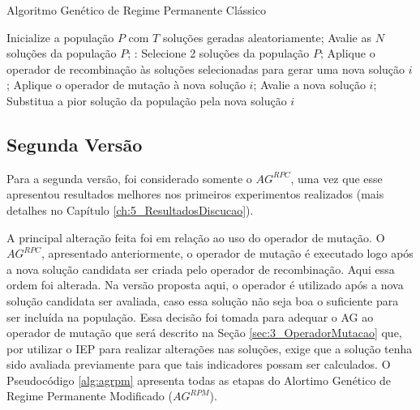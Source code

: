 \begin{algorithm}[!htbp]
  \caption{Algoritmo Genético de Regime Permanente Clássico}
  \label{alg:agrpc}
  \begin{algorithmic}
    \State Inicialize a população $P$ com $T$ soluções geradas aleatoriamente;
    \State Avalie as $N$ soluções da população $P$;
       \State:
        \State Selecione 2 soluções da população $P$;
        \State Aplique o operador de recombinação às soluções selecionadas para gerar uma nova solução $i$;
        \State Aplique o operador de mutação à nova solução $i$;
        \State Avalie a nova solução $i$;
          \State Substitua a pior solução da população pela nova solução $i$	
        \EndIf
      \EndFor
    \EndWhile
  \end{algorithmic}
\end{algorithm}

\subsection{Segunda Versão}
\label{sec:3_SegundaVersao}
Para a segunda versão, foi considerado somente o $AG^{RPC}$, uma vez que esse apresentou resultados melhores nos primeiros experimentos realizados (mais detalhes no Capítulo \ref{ch:5_ResultadosDiscucao}). 

A principal alteração feita foi em relação ao uso do operador de mutação. O $AG^{RPC}$, apresentado anteriormente, o operador de mutação é executado logo após a nova solução candidata ser criada pelo operador de recombinação. Aqui essa ordem foi alterada. Na versão proposta aqui, o operador é utilizado após a nova solução candidata ser avaliada, caso essa solução não seja boa o suficiente para ser incluída na população. Essa decisão foi tomada para adequar o AG ao operador de mutação que será descrito na Seção \ref{sec:3_OperadorMutacao} que, por utilizar o IEP para realizar alterações nas soluções, exige que a solução tenha sido avaliada previamente para que tais indicadores possam ser calculados. O Pseudocódigo \ref{alg:agrpm} apresenta todas as etapas do Alortimo Genético de Regime Permanente Modificado ($AG^{RPM}$).

